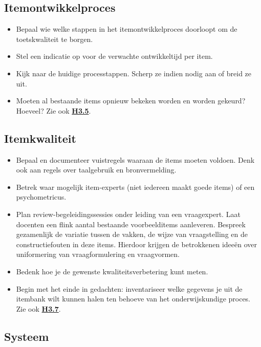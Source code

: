 \documentclass[
]{book}
\providecommand{\tightlist}{%
  \setlength{\itemsep}{0pt}\setlength{\parskip}{0pt}}
\begin{document}
\hypertarget{itemontwikkelproces}{%
\subsection{Itemontwikkelproces}\label{itemontwikkelproces}}

\begin{itemize}
\tightlist
\item
  Bepaal wie welke stappen in het itemontwikkelproces doorloopt om de toetskwaliteit te borgen.
\item
  Stel een indicatie op voor de verwachte ontwikkeltijd per item.
\item
  Kijk naar de huidige processtappen. Scherp ze indien nodig aan of breid ze uit.
\item
  Moeten al bestaande items opnieuw bekeken worden en worden gekeurd? Hoeveel? Zie ook \textbf{\protect\hyperlink{organisatie-processtappen-rollen-en-rechten}{H3.5}}.
\end{itemize}

\hypertarget{itemkwaliteit}{%
\subsection{Itemkwaliteit}\label{itemkwaliteit}}

\begin{itemize}
\tightlist
\item
  Bepaal en documenteer vuistregels waaraan de items moeten voldoen. Denk ook aan regels over taalgebruik en bronvermelding.
\item
  Betrek waar mogelijk item-experts (niet iedereen maakt goede items) of een psychometricus.
\item
  Plan review-begeleidingssessies onder leiding van een vraagexpert. Laat docenten een flink aantal bestaande voorbeelditems aanleveren. Bespreek gezamenlijk de variatie tussen de vakken, de wijze van vraagstelling en de constructiefouten in deze items. Hierdoor krijgen de betrokkenen ideeën over uniformering van vraagformulering en vraagvormen.
\item
  Bedenk hoe je de gewenste kwaliteitsverbetering kunt meten.
\item
  Begin met het einde in gedachten: inventariseer welke gegevens je uit de itembank wilt kunnen halen ten behoeve van het onderwijskundige proces. Zie ook \textbf{\protect\hyperlink{didactiek-kwaliteit-van-items}{H3.7}}.
\end{itemize}

\hypertarget{systeem}{%
\subsection{Systeem}\label{systeem}}
\end{document}

